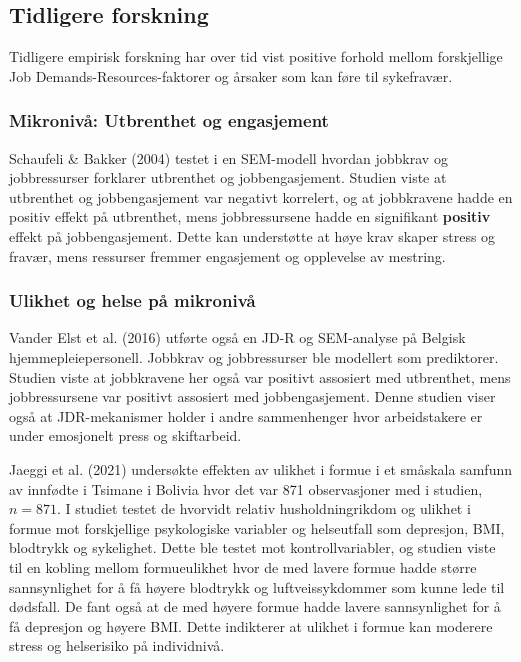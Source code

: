 \documentclass[
  12pt,
  a4paper,
  DIV=11,
  numbers=noendperiod]{scrartcl}
\begin{document}
\subsection{Tidligere forskning}\label{tidligere-forskning}

Tidligere empirisk forskning har over tid vist positive forhold mellom
forskjellige Job Demands-Resources-faktorer og årsaker som kan føre til
sykefravær.

\subsubsection{Mikronivå: Utbrenthet og
engasjement}\label{mikronivuxe5-utbrenthet-og-engasjement}

Schaufeli \& Bakker (2004) testet i en SEM-modell hvordan jobbkrav og
jobbressurser forklarer utbrenthet og jobbengasjement. Studien viste at
utbrenthet og jobbengasjement var negativt korrelert, og at jobbkravene
hadde en positiv effekt på utbrenthet, mens jobbressursene hadde en
signifikant \textbf{positiv} effekt på jobbengasjement. Dette kan
understøtte at høye krav skaper stress og fravær, mens ressurser fremmer
engasjement og opplevelse av mestring.

\subsubsection{Ulikhet og helse på
mikronivå}\label{ulikhet-og-helse-puxe5-mikronivuxe5}

Vander Elst et al. (2016) utførte også en JD-R og SEM-analyse på Belgisk
hjemmepleiepersonell. Jobbkrav og jobbressurser ble modellert som
prediktorer. Studien viste at jobbkravene her også var positivt
assosiert med utbrenthet, mens jobbressursene var positivt assosiert med
jobbengasjement. Denne studien viser også at JDR-mekanismer holder i
andre sammenhenger hvor arbeidstakere er under emosjonelt press og
skiftarbeid.

Jaeggi et al. (2021) undersøkte effekten av ulikhet i formue i et
småskala samfunn av innfødte i Tsimane i Bolivia hvor det var 871
observasjoner med i studien, \(n = 871\). I studiet testet de hvorvidt
relativ husholdningrikdom og ulikhet i formue mot forskjellige
psykologiske variabler og helseutfall som depresjon, BMI, blodtrykk og
sykelighet. Dette ble testet mot kontrollvariabler, og studien viste til
en kobling mellom formueulikhet hvor de med lavere formue hadde større
sannsynlighet for å få høyere blodtrykk og luftveissykdommer som kunne
lede til dødsfall. De fant også at de med høyere formue hadde lavere
sannsynlighet for å få depresjon og høyere BMI. Dette indikterer at
ulikhet i formue kan moderere stress og helserisiko på individnivå.
\end{document}
